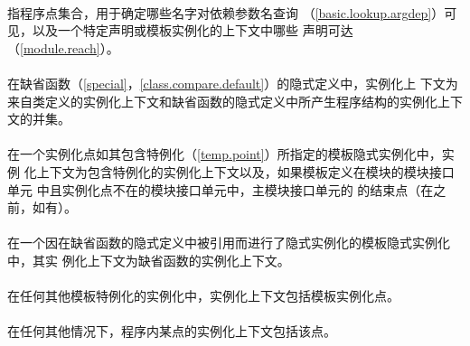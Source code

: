 \paragraph{} %
指程序点集合，用于确定哪些名字对依赖参数名查询
（\ref{basic.lookup.argdep}）可见，以及一个特定声明或模板实例化的上下文中哪些
声明可达（\ref{module.reach}）。

\paragraph{} %
在缺省函数（\ref{special}，\ref{class.compare.default}）的隐式定义中，实例化上
下文为来自类定义的实例化上下文和缺省函数的隐式定义中所产生程序结构的实例化上下
文的并集。

\paragraph{} %
在一个实例化点如其包含特例化（\ref{temp.point}）所指定的模板隐式实例化中，实例
化上下文为包含特例化的实例化上下文以及，如果模板定义在模块的模块接口单元
中且实例化点不在的模块接口单元中，主模块接口单元的
的结束点（在之前，如有）。

\paragraph{} %
在一个因在缺省函数的隐式定义中被引用而进行了隐式实例化的模板隐式实例化中，其实
例化上下文为缺省函数的实例化上下文。

\paragraph{} %
在任何其他模板特例化的实例化中，实例化上下文包括模板实例化点。

\paragraph{} %
在任何其他情况下，程序内某点的实例化上下文包括该点。


